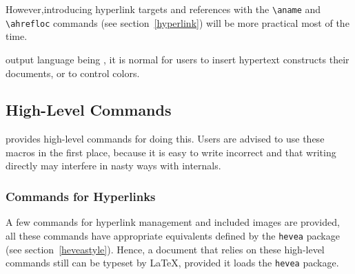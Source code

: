 However,introducing \html{} hyperlink targets and
references with the \verb+\aname+ and \verb+\ahrefloc+ commands
(see section~\ref{hyperlink})
will be more practical most of the time.




\hevea{} output language being \html{}, it is normal for users to insert
hypertext constructs their documents, or to control colors.

\subsection{High-Level Commands}
\hevea{} provides high-level commands for doing this.
Users are advised to use these macros in the first place,
because it is easy to write incorrect \html{} and that writing
\html{} directly may interfere in nasty ways with \hevea{} internals.


\subsubsection{Commands for Hyperlinks}\label{hyperlink}
A few commands for hyperlink  management and included images
are provided, all these
commands have appropriate equivalents defined by the \texttt{hevea}
package (see section~\ref{heveastyle}).
Hence, a document that relies on these high-level commands
still can be typeset by \LaTeX{}, provided it loads the \texttt{hevea}
package.

